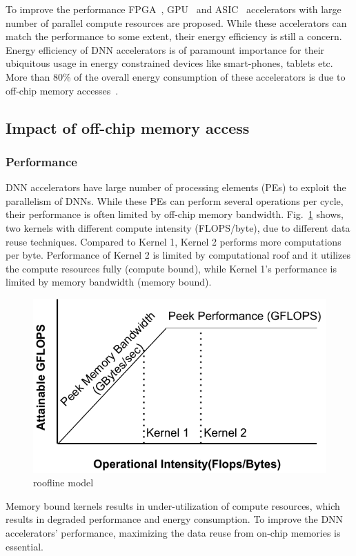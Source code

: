 \documentclass[a4paper,10pt]{article}
\begin{document}
To improve the performance  FPGA~\cite{zhang2015optimizing,wei2019overcoming,gokhale2014240,8742284,gupta2015deep,alwani2016fused}, GPU~\cite{chetlur2014cudnn} and ASIC~\cite{Chen2016EyerissAS,chen2014diannao,chen2014dadiannao,du2015shidiannao} accelerators with large number of parallel compute resources are proposed. While these accelerators can match the performance to some extent, their energy efficiency is still a concern.  Energy efficiency of DNN accelerators is of paramount importance for their ubiquitous usage in energy constrained devices like smart-phones, tablets etc. More than 80\% of the overall energy consumption of these accelerators is due to off-chip memory accesses~\cite{chen2014diannao}. 
\subsection{Impact of off-chip memory access}
\subsubsection{Performance}
DNN accelerators have large number of processing elements (PEs) to exploit the parallelism of DNNs. While these PEs can perform several operations per cycle, their performance is often limited by off-chip memory bandwidth. Fig.~\ref{fig:roofline} shows, two kernels with different compute intensity (FLOPS/byte), due to different data reuse techniques. Compared to Kernel 1, Kernel 2 performs more computations per byte. Performance of Kernel 2 is limited by computational roof and it utilizes the compute resources fully (compute bound), while Kernel 1's performance is limited by memory bandwidth (memory bound).
\begin{figure}[!htb]
	\centering
	\includegraphics[width=0.5\linewidth]{roofline}
	\caption{roofline model}
	\label{fig:roofline}
\end{figure}
Memory bound kernels results in under-utilization of compute resources, which results in degraded performance and energy consumption. To improve the DNN accelerators' performance, maximizing the data reuse from on-chip memories is essential.
\end{document}
